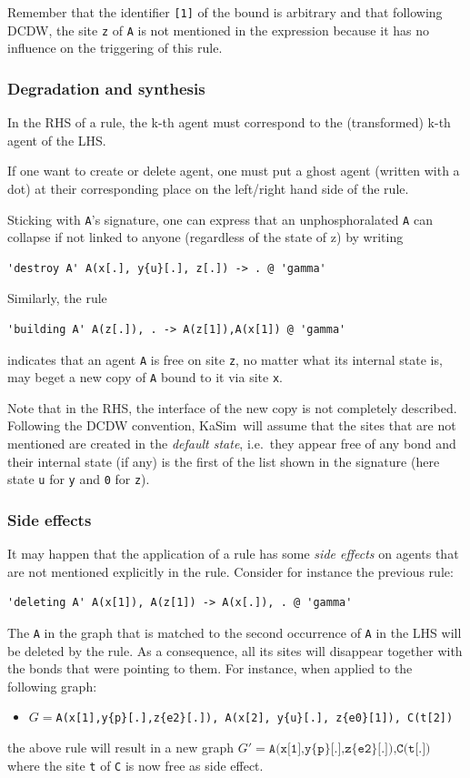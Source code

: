 \documentclass[11pt]{book}
\def\KaSim{\textsf{KaSim}}
\def\ttt#1{\texttt{#1}}
\def\ie{i.e.~}
\def\via{via }
\def\ITE#1{\begin{itemize}#1\end{itemize}}
\begin{document}
Remember that the identifier \ttt{[1]} of the bound is arbitrary and
that following DCDW, the site \ttt{z}
of \ttt{A} is not mentioned in the expression because it has no
influence on the triggering of this rule.

\subsubsection*{Degradation and synthesis}
In the RHS of a rule, the k-th agent must correspond to
the (transformed) k-th agent of the LHS.

If one want to create or delete agent, one must put a ghost agent
(written with a dot) at their corresponding place on the left/right
hand side of the rule.

Sticking with \ttt{A}'s signature, one can
express that an unphosphoralated \ttt{A} can collapse if not linked to
anyone (regardless of the state of z) by writing
\begin{lstlisting}[language=kappa]
'destroy A' A(x[.], y{u}[.], z[.]) -> . @ 'gamma'
\end{lstlisting}

Similarly, the rule
\begin{lstlisting}[language=kappa]
'building A' A(z[.]), . -> A(z[1]),A(x[1]) @ 'gamma'
\end{lstlisting}
indicates that an agent \ttt{A} is free on site \ttt{z}, no matter what
its internal state is, may beget a new copy of \ttt{A} bound to it
\via site \ttt{x}.

Note that in the RHS, the interface of the new copy is not completely
described. Following the DCDW convention,
\KaSim~will assume that the sites that are not
mentioned are created in the \emph{default state}, {\ie}they appear free of any bond and their internal state
(if any) is the first of the list shown in the signature
 (here state \ttt{u} for \ttt{y} and \ttt{0} for \ttt{z}).

\subsubsection*{Side effects}\label{sec:side-effect}

It may happen that the application of a rule has some \emph{side
  effects} on agents that are not mentioned
explicitly in the rule. Consider for instance the previous rule:
\begin{lstlisting}[language=kappa]
'deleting A' A(x[1]), A(z[1]) -> A(x[.]), . @ 'gamma'
\end{lstlisting}
The \ttt{A} in the graph that is matched to the second occurrence of
\ttt{A} in the LHS will be deleted by the rule. As a consequence, all
its sites will disappear together with the bonds that were pointing to
them. For instance, when applied to the following graph: \ITE{
\item[] $G=$\ttt{A(x[1],y\{p\}[.],z\{e2\}[.]), A(x[2], y\{u\}[.],
  z\{e0\}[1]), C(t[2])} } the above rule will result in a new graph
$G' =\ttt{A(x[1],y\{p\}[.],z\{e2\}[.]),C(t[.])}$ where the site
\ttt{t} of \ttt{C} is now free as side effect.
\end{document}
